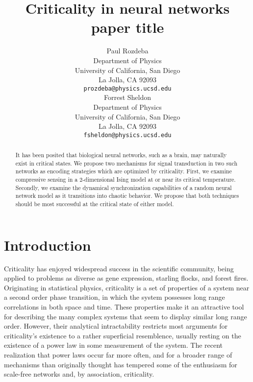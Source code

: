 \documentclass{article} %
\title{Criticality in neural networks paper title}
\author{
Paul Rozdeba%
\\
Department of Physics\\
University of California, San Diego\\
La Jolla, CA 92093 \\
\texttt{prozdeba@physics.ucsd.edu} \\
\And
Forrest Sheldon \\
Department of Physics\\
University of California, San Diego\\
La Jolla, CA 92093 \\
\texttt{fsheldon@physics.ucsd.edu} \\
}
\begin{document}
\maketitle

\begin{abstract}
It has been posited that biological neural networks, such as a brain, may
naturally exist in critical states.  We propose two mechanisms for signal
transduction in two such networks as encoding strategies which are optimized by
criticality.  First, we examine compressive sensing in a 2-dimensional Ising
model at or near its critical temperature.  Secondly, we examine the dynamical
synchronization capabilities of a random neural network model as it transitions
into chaotic behavior.  We propose that both techniques should be most successful
at the critical state of either model.
\end{abstract}

\section{Introduction}
Criticality has enjoyed widespread success in the scientific community, being
applied to problems as diverse as gene expression, starling flocks, and forest
fires.\cite{maybe}  Originating in statistical physics, criticality is a set
of properties of a system near a second order phase transition, in which the
system possesses long range correlations in both space and time.  These
properties make it an attractive tool for describing the many complex systems
that seem to display similar long range order.  However, their analytical
intractability restricts most arguments for criticality's existence to a
rather superficial resemblence, usually resting on the existence of a power
law in some measurement of the system. The recent realization that power laws
occur far more often, and for a broader range of mechanisms than originally
thought has tempered some of the enthusiasm for scale-free networks and, by
association, criticality.\cite{keller}
\end{document}

